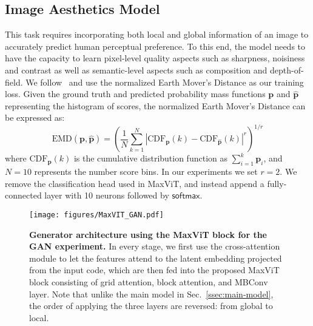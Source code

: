 \documentclass[runningheads]{llncs}
\begin{document}
\subsection{Image Aesthetics Model}
\label{ssec:image-quality-model}

This task requires incorporating both local and global information of an image to accurately predict human perceptual preference. To this end, the model needs to have the capacity to learn pixel-level quality aspects such as sharpness, noisiness and contrast as well as semantic-level aspects such as composition and depth-of-field. We follow~\cite{talebi2018nima} and use the normalized Earth Mover's Distance as our training loss. Given the ground truth and predicted probability mass functions $\textbf{p}$ and $\widehat{\textbf{p}}$ representing the histogram of scores, the normalized Earth Mover's Distance can be expressed as:
\begin{equation}
\label{eqn:emd}
\mbox{EMD}(\textbf{p}, \widehat{\textbf{p}}) = \left( \frac{1}{N} \sum_{k=1}^{N} |\mbox{CDF}_{\textbf{p}}(k) - \mbox{CDF}_{\widehat{\textbf{p}}}(k)|^r \right)^{1/r}
\end{equation}
where $\mbox{CDF}_{\textbf{p}}(k)$ is the cumulative distribution function as $\sum_{i=1}^{k} \textbf{p}_{i}$, and $N=10$ represents the number score bins. In our experiments we set $r=2$. We remove the classification head used in MaxViT, and instead append a fully-connected layer with 10 neurons followed by $\mathsf{softmax}$.





\begin{figure}[!t]
\centering
\texttt{[image: figures/MaxVIT\_GAN.pdf]}
\caption{\textbf{Generator architecture using the MaxViT block for the GAN experiment.}
In every stage, we first use the cross-attention module to let the features attend to the latent embedding projected from the input code, which are then fed into the proposed MaxViT block consisting of grid attention, block attention, and MBConv layer. Note that unlike the main model in Sec.~\ref{ssec:main-model}, the order of applying the three layers are reversed: from global to local.}
\label{fig:gan-architecture}
\end{figure}
\end{document}

